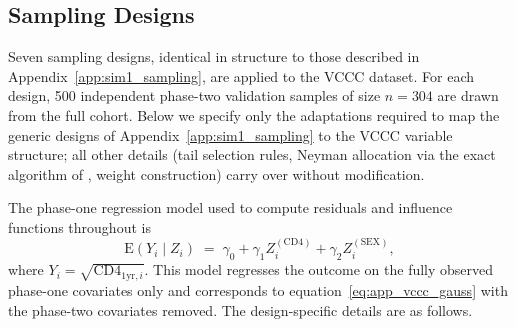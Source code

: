\subsection{Sampling Designs}
\label{app:vccc_sampling}

Seven sampling designs, identical in structure to those described in Appendix~\ref{app:sim1_sampling}, are applied to the VCCC dataset. For each design, 500 independent phase-two validation samples of size $n = 304$ are drawn from the full cohort. Below we specify only the adaptations required to map the generic designs of Appendix~\ref{app:sim1_sampling} to the VCCC variable structure; all other details (tail selection rules, Neyman allocation via the exact algorithm of \citealt{wright2017exact}, weight construction) carry over without modification.

The phase-one regression model used to compute residuals and influence functions throughout is
\begin{equation}
    \mathrm{E}(Y_i \mid Z_i) \;=\;
    \gamma_0
    + \gamma_1 Z_i^{(\mathrm{CD4})}
    + \gamma_2 Z_i^{(\mathrm{SEX})},
    \label{eq:app_vccc_phase1}
\end{equation}
where $Y_i = \sqrt{\mathrm{CD4}_{1\mathrm{yr},i}}$. This model regresses the outcome on the fully observed phase-one covariates only and corresponds to equation~\eqref{eq:app_vccc_gauss} with the phase-two covariates removed. The design-specific details are as follows.

